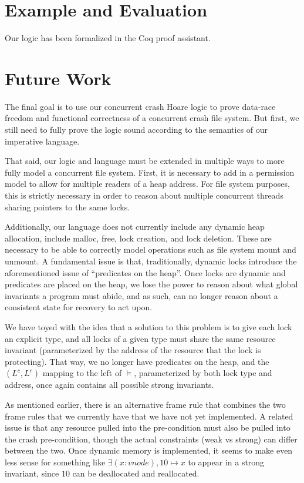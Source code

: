 \section{Example and Evaluation}

Our logic has been formalized in the Coq proof assistant.


\section{Future Work}


The final goal is to use our concurrent crash Hoare logic to prove data-race
freedom and functional correctness of a concurrent crash file system.
But first,
we still need to fully prove the logic sound according to the semantics of our
imperative language.

That said, our logic and language must be extended in multiple ways to more
fully model a concurrent file system.
First, it is necessary to add in a
permission model to allow for multiple readers of a heap address.
For file
system purposes, this is strictly necessary in order to reason about multiple
concurrent threads sharing pointers to the same locks.

Additionally, our language does not currently include any dynamic heap
allocation, include malloc, free, lock creation, and lock deletion.
These are
necessary to be able to correctly model operations such as file system mount and
unmount.
A fundamental issue is that, traditionally, dynamic locks introduce the
aforementioned issue of ``predicates on the heap''.
Once locks are dynamic and
predicates are placed on the heap, we lose the power to reason about what global
invariants a program must abide, and as such, can no longer reason about a
consistent state for recovery to act upon.

We have toyed with the idea that a solution to this problem is to give each lock
an explicit type, and all locks of a given type must share the same resource
invariant (parameterized by the address of the resource that the lock is
protecting).
That way, we no longer have predicates on the heap, and the
$(L^c,L^r)$ mapping to the left of $\vDash$, parameterized by both lock type and
address, once again contains all possible strong invariants.

As mentioned earlier, there is an alternative frame rule that combines the two
frame rules that we currently have that we have not yet implemented.
A related
issue is that any resource pulled into the pre-condition must also be pulled
into the crash pre-condition, though the actual constraints (weak vs strong)
can differ between the two.
Once dynamic memory is implemented, it seems to make
even less sense for something like $\exists (x:vnode), 10\mapsto x$ to appear in
a strong invariant, since $10$ can be deallocated and reallocated.

